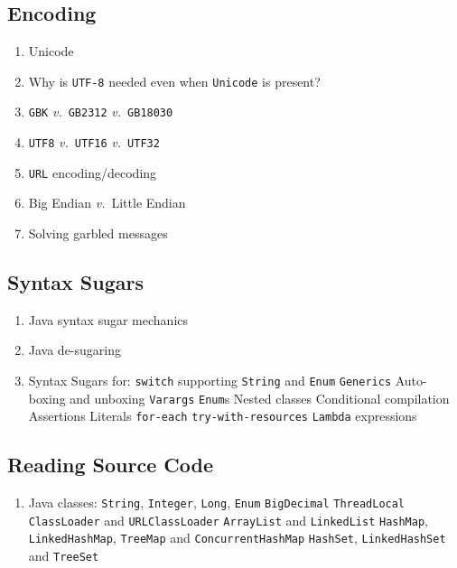 \documentclass[11pt, twocolumn]{article}
\newcommand{\versus}{\textit{v.}\ }
\begin{document}
\subsection{Encoding}
\begin{enumerate}
	\item Unicode
	\item Why is \texttt{UTF-8} needed even when \texttt{Unicode} is present?
	\item \texttt{GBK} \versus \texttt{GB2312} \versus \texttt{GB18030}
	\item \texttt{UTF8} \versus \texttt{UTF16} \versus \texttt{UTF32}
	\item \texttt{URL} encoding/decoding
	\item Big Endian \versus Little Endian
	\item Solving garbled messages
\end{enumerate}

\subsection{Syntax Sugars}
\begin{enumerate}
	\item Java syntax sugar mechanics
	\item Java de-sugaring
	\item Syntax Sugars for:
	\subitem \texttt{switch} supporting \texttt{String} and \texttt{Enum}
	\subitem \texttt{Generics}
	\subitem Auto-boxing and unboxing
	\subitem \texttt{Varargs}
	\subitem \texttt{Enum}s
	\subitem Nested classes
	\subitem Conditional compilation
	\subitem Assertions
	\subitem Literals
	\subitem \texttt{for-each}
	\subitem \texttt{try-with-resources}
	\subitem \texttt{Lambda} expressions
\end{enumerate}

\subsection{Reading Source Code}
\begin{enumerate}
	\item Java classes:
	\subitem \texttt{String}, \texttt{Integer}, \texttt{Long}, \texttt{Enum}
	\subitem \texttt{BigDecimal}
	\subitem \texttt{ThreadLocal}
	\subitem \texttt{ClassLoader} and \texttt{URLClassLoader}
	\subitem \texttt{ArrayList} and \texttt{LinkedList}
	\subitem \texttt{HashMap}, \texttt{LinkedHashMap}, \texttt{TreeMap} and \texttt{ConcurrentHashMap}
	\subitem \texttt{HashSet}, \texttt{LinkedHashSet} and \texttt{TreeSet}
\end{enumerate}
\end{document}
